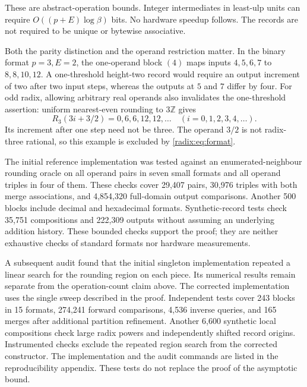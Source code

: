 These are abstract-operation bounds. Integer intermediates in least-ulp
units can require $O((p+E)\log\beta)$ bits. No hardware speedup follows.
The records are not required to be unique or bytewise associative.

Both the parity distinction and the operand restriction matter. In the
binary format $p=3,E=2$, the one-operand block $(4)$ maps inputs
$4,5,6,7$ to $8,8,10,12$. A one-threshold height-two record would require
an output increment of two after two input steps, whereas the outputs
at $5$ and $7$ differ by four. For odd radix, allowing arbitrary real
operands also invalidates the one-threshold assertion: uniform
nearest-even rounding to $3\mathbb Z$ gives
\[
 R_3(3i+3/2)=0,6,6,12,12,\ldots\quad(i=0,1,2,3,4,\ldots).
\]
Its increment after one step need not be three. The operand $3/2$ is
not radix-three rational, so this example is excluded by
\eqref{radix:eq:format}.

The initial reference implementation was tested against an enumerated-neighbour
rounding oracle on all operand pairs in seven small formats and all
operand triples in four of them. These checks cover 29,407 pairs,
30,976 triples with both merge associations, and 4,854,320 full-domain
output comparisons. Another 500 blocks include decimal and hexadecimal
formats. Synthetic-record tests check 35,751 compositions and 222,309
outputs without assuming an underlying addition history. These bounded
checks support the proof; they are neither exhaustive checks of standard
formats nor hardware measurements.

A subsequent audit found that the initial singleton implementation
repeated a linear search for the rounding region on each piece. Its
numerical results remain separate from the operation-count claim above.
The corrected implementation uses the single sweep described in the
proof. Independent tests cover 243 blocks in 15 formats, 274,241 forward
comparisons, 4,536 inverse queries, and 165 merges after additional
partition refinement. Another 6,600 synthetic local compositions check
large radix powers and independently shifted record origins. Instrumented
checks exclude the repeated region search from the corrected constructor.
The implementation and the audit commands are listed in the reproducibility
appendix. These tests do not replace the proof of the asymptotic bound.
